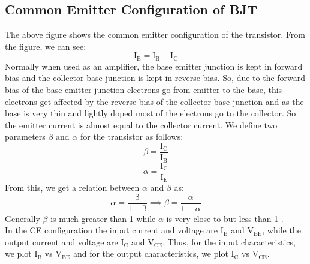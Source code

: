 \subsection{Common Emitter Configuration of BJT}

The above figure shows the common emitter configuration of the transistor. From the figure, we can see: 
$$\mathrm{I_E = I_B+ I_C}$$
Normally when used as an amplifier,
the base emitter junction is kept in forward bias and the collector base junction is kept
in reverse bias. So, due to the forward bias of the base emitter junction electrons go
from emitter to the base, this electrons get affected by the reverse bias of the collector
base junction and as the base is very thin and lightly doped most of the electrons go
to the collector. So the emitter current is almost equal to the collector current. We define two parameters $\beta$ and $\alpha$ for the transistor as follows:
$$\beta = \mathrm{\frac{I_C}{I_B}}$$
$$\alpha = \mathrm{\frac{I_C}{I_E}}$$
From this, we get a relation between $\alpha$ and $\beta$ as:
$$\alpha = \mathrm{\frac{\beta}{1+\beta}} \implies \beta = \frac{\alpha}{1-\alpha} $$
Generally $\beta$ is much greater than 1 while $\alpha$ is very close to but less than 1 .\\[0.3cm]
In the CE configuration the input current and voltage are $\mathrm{I_B}$ and $\mathrm{V_{BE}}$, while the output current and voltage are $\mathrm{I_C}$ and $\mathrm{V_{CE}}$. Thus, for the input characteristics, we plot $\mathrm{I_B}$ vs $\mathrm{V_{BE}}$ and for the output characteristics, we plot $\mathrm{I_C}$ vs $\mathrm{V_{CE}}$.\\[0.2cm]